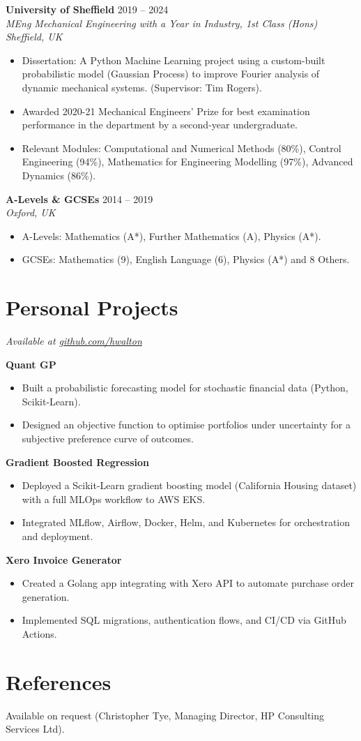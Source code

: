 \documentclass[a4paper,10pt]{article}
\newcommand{\resumeSubheading}[4]{
  \vspace{1pt}\textbf{#1} \hfill #2 \\
  \textit{#3} \hfill \textit{#4}
}
\newcommand{\resumeItem}[1]{\item{#1}}
\newcommand{\resumeItemListStart}{\begin{itemize}[leftmargin=*,itemsep=0pt,parsep=0pt]}
\newcommand{\resumeItemListEnd}{\end{itemize}\vspace{-3pt}}
\begin{document}
\resumeSubheading{University of Sheffield}{2019 -- 2024}{MEng Mechanical Engineering with a Year in Industry, 1st Class (Hons)}{Sheffield, UK}
\resumeItemListStart
  \resumeItem{Dissertation: A Python Machine Learning project using a custom-built probabilistic model
(Gaussian Process) to improve Fourier analysis of dynamic mechanical systems. (Supervisor: Tim Rogers).}
  \resumeItem{Awarded 2020-21 Mechanical Engineers' Prize for best examination performance in the department by a second-year undergraduate.}
  \resumeItem{Relevant Modules: Computational and Numerical Methods (80\%), Control Engineering (94\%), Mathematics for Engineering Modelling (97\%), Advanced Dynamics (86\%).}
\resumeItemListEnd

\resumeSubheading{A-Levels \& GCSEs}{2014 -- 2019}{}{Oxford, UK}

\vspace{-2em}

\resumeItemListStart
  \resumeItem{A-Levels: Mathematics (A*), Further Mathematics (A), Physics (A*).}
  \resumeItem{GCSEs: Mathematics (9), English Language (6), Physics (A*) and 8 Others.}
\resumeItemListEnd

\section{Personal Projects}
\hfill\textit{Available at \href{https://github.com/hwalton}{github.com/hwalton}}

\textbf{Quant GP}
\resumeItemListStart
  \resumeItem{Built a probabilistic forecasting model for stochastic financial data (Python, Scikit-Learn).}
  \resumeItem{Designed an objective function to optimise portfolios under uncertainty for a subjective preference curve of outcomes.}
\resumeItemListEnd

\textbf{Gradient Boosted Regression}
\resumeItemListStart
  \resumeItem{Deployed a Scikit-Learn gradient boosting model (California Housing dataset) with a full MLOps workflow to AWS EKS.}
  \resumeItem{Integrated MLflow, Airflow, Docker, Helm, and Kubernetes for orchestration and deployment.}
\resumeItemListEnd

\textbf{Xero Invoice Generator}
\resumeItemListStart
  \resumeItem{Created a Golang app integrating with Xero API to automate purchase order generation.}
  \resumeItem{Implemented SQL migrations, authentication flows, and CI/CD via GitHub Actions.}
\resumeItemListEnd

\section{References}
Available on request (Christopher Tye, Managing Director, HP Consulting Services Ltd).
\end{document}
